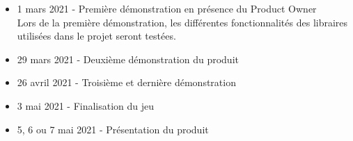 \begin{itemize}
	\item 1 mars 2021 - Première démonstration en présence du Product Owner \\
	Lors de la première démonstration, les différentes fonctionnalités des libraires utilisées dans le projet seront testées.
	\item 29 mars 2021 - Deuxième démonstration du produit
	\item 26 avril 2021 - Troisième et dernière démonstration
	\item 3 mai 2021 - Finalisation du jeu
	\item 5, 6 ou 7 mai 2021 - Présentation du produit
\end{itemize}